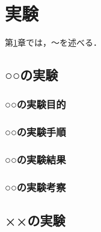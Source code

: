 ﻿%

\chapter{実験}\label{chapter:実験}
第\ref{chapter:実験}章では，～を述べる．

\section{○○の実験}
\subsection{○○の実験目的}
\subsection{○○の実験手順}
\subsection{○○の実験結果}
\subsection{○○の実験考察}

\section{××の実験}
